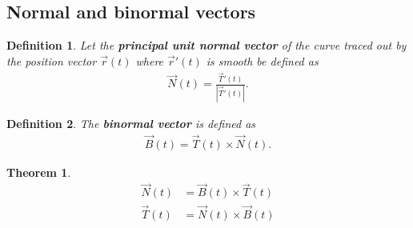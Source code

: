 \documentclass{article}
\theoremstyle{sltheorem}
\newtheorem{definition}{Definition}[section]
\newtheorem{theorem}{Theorem}[section]
\newcommand*\B[1]{\textbf{#1}}
\begin{document}
\subsection{Normal and binormal vectors}
\begin{definition}
    Let the \B{principal unit normal vector} of the curve traced out by the position vector $\vec r(t)$
    where $\vec r'(t)$ is smooth be defined as
    \begin{align*}
        \vec N (t) = \frac{\vec T'(t)}{\left| \vec T'(t) \right|}.
    \end{align*}
\end{definition}
\begin{definition}
    The \B{binormal vector} is defined as
    \begin{align*}
        \vec B(t) = \vec T(t) \times \vec N(t).
    \end{align*}
\end{definition}
\begin{theorem}
    \begin{align*}
        \vec N(t) &= \vec B(t) \times \vec T(t)\\
        \vec T(t) &= \vec N(t) \times \vec B(t)
    \end{align*}
\end{theorem}
\end{document}
